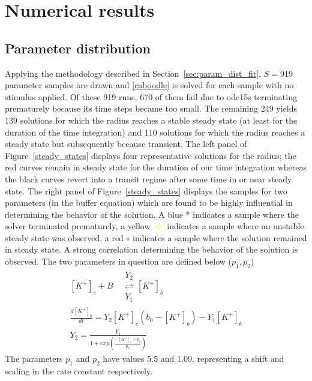 \section{Numerical results}
\label{sec:results}

\subsection{Parameter distribution}
\label{sec:param_sampling}

Applying the methodology described in Section~\ref{sec:param_dist_fit}, $S=919$ parameter samples are drawn and \eqref{caboodle} is solved for each sample with no stimulus applied. Of these 919 runs, 670 of them fail due to ode15s terminating prematurely because its time steps became too small. The remaining 249 yields 139 solutions for which the radius reaches a stable steady state (at least for the duration of the time integration) and 110 solutions for which the radius reaches a steady state but subsequently because transient. The left panel of Figure~\ref{steady_states} displays four representative solutions for the radius; the red curves remain in steady state for the duration of our time integration whereas the black curves revert into a transit regime after some time in or near steady state. The right panel of Figure~\ref{steady_states} displays the samples for two parameters (in the buffer equation) which are found to be highly influential in determining the behavior of the solution. A blue \textcolor{blue}{*} indicates a sample where the solver terminated prematurely, a yellow \textcolor{yellow}{$\Diamond$} indicates a sample where an unstable steady state was observed, a red \textcolor{red}{$\circ$} indicates a sample where the solution remained in steady state. A strong correlation determining the behavior of the solution is observed. The two parameters in question are defined below ($p_1,p_2$)
\begin{eqnarray}\label{eqn:buff}
[K^+]_e+B \quad\begin{array}{c}
Y_2 \\ 
 \rightleftharpoons \\
Y_1
\end{array} 
[K^+]_b \nonumber \\
\frac{d[K^+]_b}{dt}=Y_2[K^+]_e(b_0-[K^+]_b)-Y_1[K^+]_b \nonumber \\
Y_2=\frac{Y_1}{1+exp(\frac{-[K^+]_e+p_1}{p_2})}
\end{eqnarray}
The parameters $p_1$ and $p_2$ have values 5.5 and 1.09, representing a shift and scaling in the rate constant respectively. 
